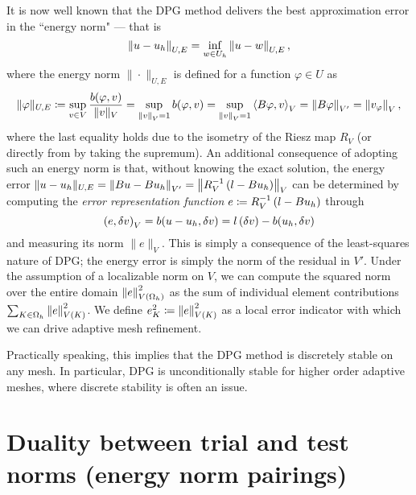 It is now well known that the DPG method delivers the best approximation error in the ``energy norm" --- that is \cite{Bui-ThanhDemkowiczGhattas11a, DPG2,DPG4} 
\begin{equation}
\eqnlab{optimalError}
\nor{u-u_h}_{U,E} = \inf_{w\in U_h} \nor{u-w}_{U,E},
\end{equation}
where the energy norm $\|\cdot \|_{U,E}$ is defined for a function $\varphi \in U$ as
\begin{equation}
\eqnlab{energyNorm} \|\varphi\|_{U,E} \coloneqq \sup_{v\in V}
\frac{b(\varphi,v)}{\|v\|_V} = \sup_{\nor{v}_V = 1} b(\varphi,v) =
\sup_{\nor{v}_V = 1} \LRa{B\varphi,v}_V = \nor{B\varphi}_{V'} =
\nor{v_\varphi}_V,
\end{equation}
where the last equality holds due to the isometry of the Riesz map
$R_V$ (or directly from  by taking the supremum). An
additional consequence of adopting such an energy norm is that,
without knowing the exact solution, the energy error $\|u-u_h\|_{U,E}  = \nor{Bu - Bu_h}_{V'} = \nor{R_V^{-1}\LRp{l-Bu_h}}_{V}$ can
be determined by computing the \textit{error representation function} $e \coloneqq R_V^{-1}\LRp{l-Bu_h}$ through
\[
\left(e,\delta v\right)_V = b(u-u_h,\delta v) = l\LRp{\delta v} - b(u_h,\delta v)
\]
and measuring its norm $\|e\|_V$.  This is simply a consequence of the least-squares nature of DPG; the energy error is simply the norm of the residual in $V'$.  Under the assumption of a localizable norm on $V$, we can compute the squared norm over the entire domain $\nor{e}_{V(\Oh)}^2$ as the sum of individual element contributions $\sum_{K\in \Oh} \nor{e}_{V(K)}^2$.  We define $e_K^2 \coloneqq \nor{e}_{V(K)}^2$ as a local error indicator with which we can drive adaptive mesh refinement.  

Practically speaking, this implies that the DPG method is discretely stable on any mesh. In particular, DPG is unconditionally stable for higher order adaptive meshes, where discrete stability is often an issue. 

\section{Duality between trial and test norms (energy norm pairings)}

